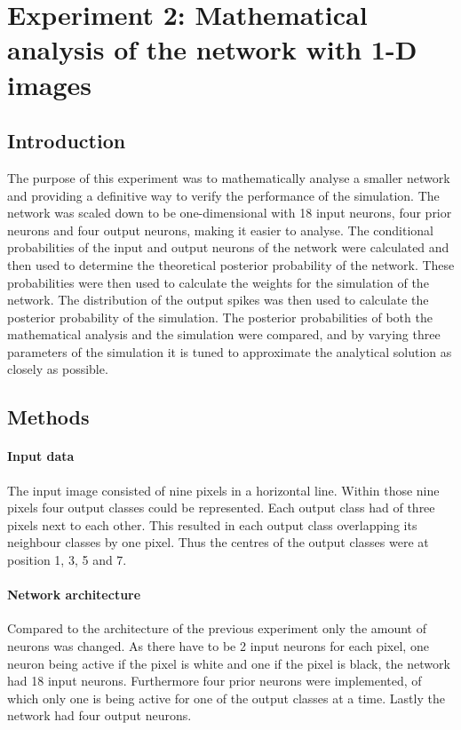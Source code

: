 \section{Experiment 2: Mathematical analysis of the network with 1-D images}
\label{section:1D}

\subsection{Introduction}

The purpose of this experiment was to mathematically analyse a smaller network and providing a definitive way to verify the performance of the simulation. The network was scaled down to be one-dimensional with 18 input neurons, four prior neurons and four output neurons, making it easier to analyse. The conditional probabilities of the input and output neurons of the network  were calculated and then used to determine the theoretical posterior probability of the network. These probabilities were then used to calculate the weights for the simulation of the network. The distribution of the output spikes was then used to calculate the posterior probability of the simulation. The posterior probabilities of both the mathematical analysis and the simulation were compared, and by varying three parameters of the simulation it is tuned to approximate the analytical solution as closely as possible.

\subsection{Methods}

\paragraph{Input data}
The input image consisted of nine pixels in a horizontal line. Within those nine pixels four output classes could be represented. Each output class had of three pixels next to each other. This resulted in each output class overlapping its neighbour classes by one pixel. Thus the centres of the output classes were at position 1, 3, 5 and 7.
 
\paragraph{Network architecture}
Compared to the architecture of the previous experiment only the amount of neurons was changed. As there have to be 2 input neurons for each pixel, one neuron being active if the pixel is white and one if the pixel is black, the network had 18 input neurons. Furthermore four prior neurons were implemented, of which only one is being active for one of the output classes at a time. Lastly the network had four output neurons.

